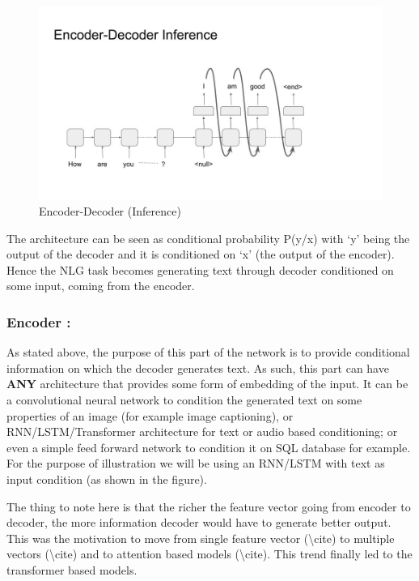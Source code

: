 \documentclass[]{krantz}
\begin{document}
\begin{figure}
\centering
\includegraphics{figures/04-01-use-case1/encoder_decoder_inf.jpg}
\caption{Encoder-Decoder (Inference)}
\end{figure}

The architecture can be seen as conditional probability P(y/x) with `y' being the output of the decoder and it is conditioned on `x' (the output of the encoder). Hence the NLG task becomes generating text through decoder conditioned on some input, coming from the encoder.

\hypertarget{encoder}{%
\subsubsection{Encoder :}\label{encoder}}

As stated above, the purpose of this part of the network is to provide conditional information on which the decoder generates text. As such, this part can have \textbf{ANY} architecture that provides some form of embedding of the input. It can be a convolutional neural network to condition the generated text on some properties of an image (for example image captioning), or RNN/LSTM/Transformer architecture for text or audio based conditioning; or even a simple feed forward network to condition it on SQL database for example. For the purpose of illustration we will be using an RNN/LSTM with text as input condition (as shown in the figure).

The thing to note here is that the richer the feature vector going from encoder to decoder, the more information decoder would have to generate better output. This was the motivation to move from single feature vector (\textbackslash{}cite) to multiple vectors (\textbackslash{}cite) and to attention based models (\textbackslash{}cite). This trend finally led to the transformer based models.
\end{document}
